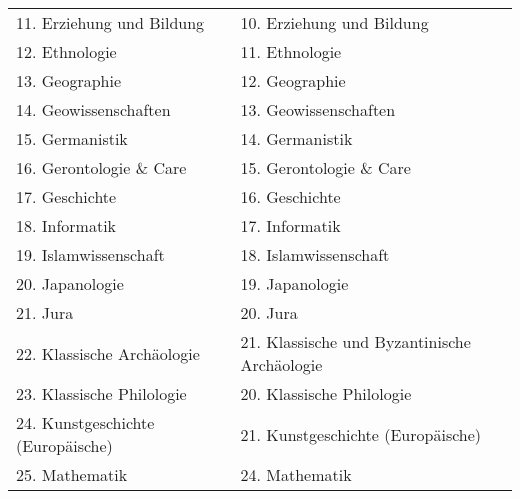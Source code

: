 {\begin{longtable}{|p{7.5cm}|p{7.5cm}|}
        11. Erziehung und Bildung                                        & 10. Erziehung und Bildung                                        \\
        12. Ethnologie                                                   & 11. Ethnologie                                                   \\
        13. Geographie                                                   & 12. Geographie                                                   \\
        14. Geowissenschaften                                            & 13. Geowissenschaften                                            \\
        15. Germanistik                                                  & 14. Germanistik                                                  \\
        16. Gerontologie \& Care                                         & 15. Gerontologie \& Care                                         \\
        17. Geschichte                                                   & 16. Geschichte                                                   \\
        18. Informatik                                                   & 17. Informatik                                                   \\
        19. Islamwissenschaft                                            & 18. Islamwissenschaft                                            \\
        20. Japanologie                                                  & 19. Japanologie                                                  \\
        21. Jura                                                         & 20. Jura                                                         \\
        22. Klassische Archäologie                                       & 21. Klassische und Byzantinische Archäologie                     \\
        23. Klassische Philologie                                        & 20. Klassische Philologie                                        \\
        24. Kunstgeschichte (Europäische)                                & 21. Kunstgeschichte (Europäische)                                \\
        25. Mathematik                                                   & 24. Mathematik                                                   \\

\end{longtable}}
